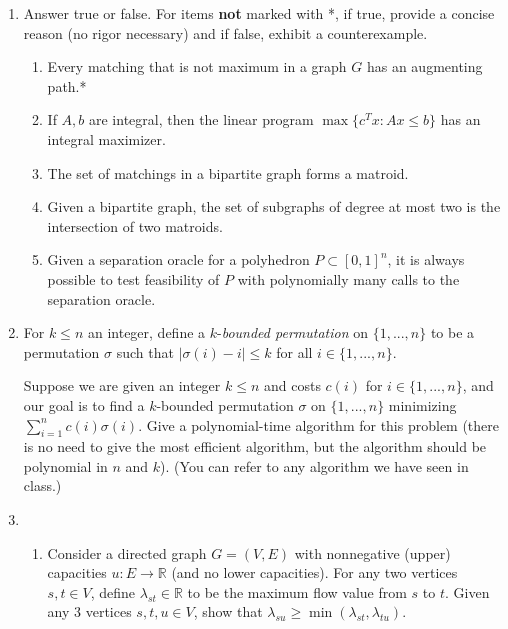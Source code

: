 \documentclass[12pt]{article}
\begin{document}
\begin{enumerate}

\item
Answer true or false. For items \textbf{not} marked with *, if true, provide a concise reason (no rigor necessary) and if false, exhibit a counterexample.
\begin{enumerate}
\item Every matching that is not maximum in a graph $G$ has an augmenting path.*
\item If $A, b$ are integral, then the linear program $\max\{c^T x: Ax \leq b\}$ has an integral maximizer.
\item The set of matchings in a bipartite graph forms a matroid.
\item Given a bipartite graph, the set of subgraphs of degree at most two is the intersection of two matroids.
\item Given a separation oracle for a polyhedron $P\subset [0,1]^n$, it is always possible to test feasibility of $P$ with polynomially many calls to the separation oracle.
\end{enumerate}


\newpage
\item

For $k \le n$ an integer, define a $k$-\emph{bounded permutation} on $\{1, ..., n\}$ to be a permutation $\sigma$ such that $|\sigma(i) - i| \le k$ for all $i \in \{1, ..., n\}$.

Suppose we are given an integer $k \le n$ and costs $c(i)$ for $i\in\{1,...,n\}$, and our goal is to find a $k$-bounded permutation $\sigma$ on $\{1, ..., n\}$ minimizing $\sum_{i=1}^n c(i) \sigma(i)$. Give a polynomial-time  algorithm for this problem (there is no need to give the most efficient algorithm, but the algorithm should be polynomial in $n$ and $k$). (You can refer to any algorithm we have seen in class.)



\newpage

\item
\begin{enumerate}
	\item
Consider a directed graph $G=(V,E)$ with nonnegative (upper) capacities $u: E \rightarrow {\mathbb R}$ (and no lower capacities). For any two vertices $s, t\in V$, define $\lambda_{st}\in {\mathbb R}$ to be the maximum flow value from $s$ to $t$. Given any 3 vertices $s, t, u\in V$, show that $\lambda_{su} \geq \min(\lambda_{st},\lambda_{tu})$.


\end{enumerate}
\end{enumerate}
\end{document}
